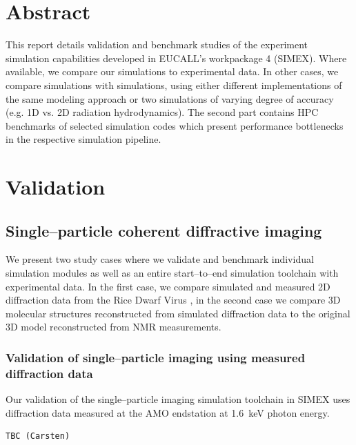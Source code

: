\documentclass[10pt]{scrartcl}
\begin{document}
\section*{Abstract}
%
This report details validation and benchmark studies of the experiment simulation capabilities
developed in EUCALL's workpackage 4 (SIMEX). Where available, we compare our
simulations to experimental data. In other cases, we compare simulations with
simulations, using either different implementations of the same modeling
approach or two simulations of varying degree of accuracy (e.g. 1D vs. 2D
radiation hydrodynamics). The second part contains HPC benchmarks of selected
simulation codes which present performance bottlenecks in the respective
simulation pipeline.
%
\tableofcontents
%
\section{Validation}%
\subsection{Single--particle coherent diffractive imaging\label{sec:single_particle_imaging}}
We present two study cases where we validate and benchmark individual simulation
modules as well as an entire start--to--end simulation toolchain with
experimental data. In the first case, we compare simulated and measured 2D
diffraction data from the Rice Dwarf Virus \cite{Munke2016}, in the second case
we compare 3D molecular structures reconstructed from simulated diffraction data
to the original 3D model reconstructed from NMR \cite{Schlessman1998}
measurements.
\subsubsection{Validation of single--particle imaging using measured diffraction data }
Our validation of the single--particle imaging simulation toolchain in SIMEX
uses diffraction data measured at the AMO endstation at
\SI{1.6}{\kilo\electronvolt} photon energy.
%
\begin{verbatim}
TBC (Carsten)
\end{verbatim}
%
\end{document}
